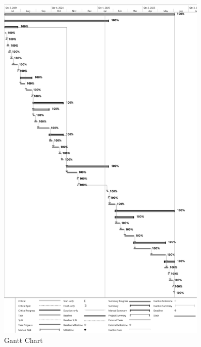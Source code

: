 \begin{figure}[H]  
    \centering
    \includegraphics[width=0.9\textwidth]{Images/Gantt Chart.png}  
    \caption{Gantt Chart}
    \label{Gantt Chart}  %
\end{figure}

\pagebreak
